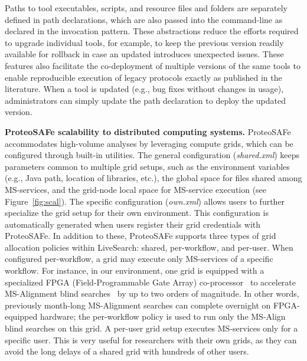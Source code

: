 \documentclass[arial,11pt]{article}
\newcommand{\SF}[1]{\textsf{#1}}
\newcommand{\SYSTEM}[0]{\SF{ProteoSAFe}\xspace}
\newcommand{\LiveSearch}[0]{\SF{LiveSearch}\xspace}
\begin{document}
Paths to tool executables, scripts, and resource files and folders are separately defined in path declarations, which are also passed into the command-line as declared in the invocation pattern.
These abstractions reduce the efforts required to upgrade individual tools, for example, to keep the previous version readily available for rollback in case an updated introduces unexpected issues.
These features also facilitate the co-deployment of multiple versions of the same tools to enable reproducible execution of legacy protocols exactly as published in the literature.
When a tool is updated (e.g., bug fixes without changes in usage), administrators can simply update the path declaration to deploy the updated version.


{\bf ProteoSAFe scalability to distributed computing systems.} \SYSTEM accommodates high-volume analyses by leveraging compute grids, which can be configured through built-in utilities.
%
The general configuration ({\em  shared.xml}) keeps parameters common to multiple grid setups, such as the environment variables (e.g., Java path, location of libraries, etc.), the global space for files shared among MS-services, and the grid-node local space for MS-service execution (see Figure~\ref{fig:scal}).
The specific configuration ({\em  own.xml}) allows users to further specialize the grid setup for their own environment.
This configuration is automatically generated when users register their grid credentials with \SYSTEM.
%
In addition to these, \SYSTEM supports three types  of grid allocation policies within \LiveSearch: shared, per-workflow, and per-user. When configured \SF{per-workflow}, a grid may execute only MS-services of a specific workflow. For instance, in our environment, one grid is equipped with a specialized FPGA (Field-Programmable Gate Array) co-processor~\cite{Convey} to accelerate MS-Alignment blind searches~\cite{Tsur:2005} by up to two orders of magnitude. In other words, previously month-long MS-Alignment searches can complete overnight on FPGA-equipped hardware; the per-workflow policy is used to run only the MS-Align blind searches on this grid.
A \SF{per-user} grid setup executes MS-services only for a specific user. This is very useful for researchers with their own grids, as they can avoid the long delays of a shared grid with hundreds of other users.
\end{document}
